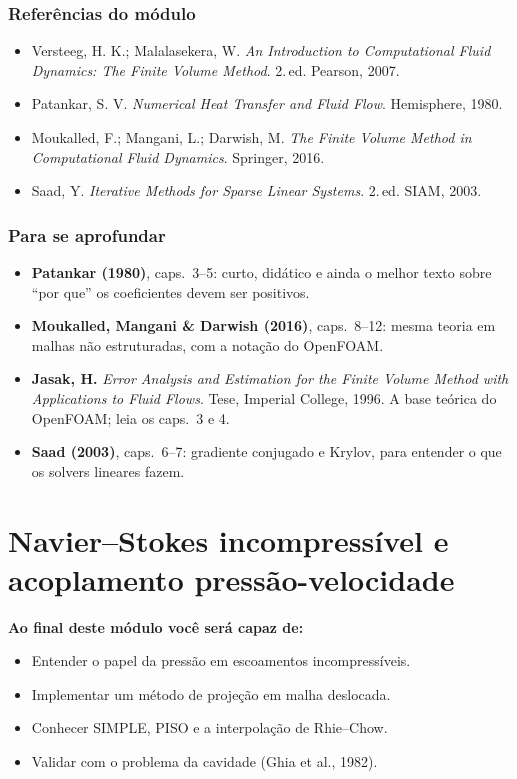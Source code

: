 \documentclass[10pt,a4paper,twocolumn,openany]{report}
\newenvironment{refs}{\subsection*{Referências do módulo}\small}{\par}
\newenvironment{aprofundar}{\subsection*{\textcolor{amarelo}{Para se aprofundar}}\small}{\par}
\newcommand{\objetivos}{\noindent\textbf{Ao final deste módulo você será capaz de:}}
\begin{document}
\begin{refs}
\begin{itemize}
  \item Versteeg, H. K.; Malalasekera, W. \emph{An Introduction to Computational Fluid Dynamics: The Finite Volume Method}. 2.\,ed. Pearson, 2007.
  \item Patankar, S. V. \emph{Numerical Heat Transfer and Fluid Flow}. Hemisphere, 1980.
  \item Moukalled, F.; Mangani, L.; Darwish, M. \emph{The Finite Volume Method in Computational Fluid Dynamics}. Springer, 2016.
  \item Saad, Y. \emph{Iterative Methods for Sparse Linear Systems}. 2.\,ed. SIAM, 2003.
\end{itemize}
\end{refs}

\begin{aprofundar}
\begin{itemize}[leftmargin=*]
  \item \textbf{Patankar (1980)}, caps.\ 3--5: curto, didático e ainda o melhor texto sobre ``por que'' os coeficientes devem ser positivos.
  \item \textbf{Moukalled, Mangani \& Darwish (2016)}, caps.\ 8--12: mesma teoria em malhas não estruturadas, com a notação do OpenFOAM.
  \item \textbf{Jasak, H.} \emph{Error Analysis and Estimation for the Finite Volume Method with Applications to Fluid Flows}. Tese, Imperial College, 1996. A base teórica do OpenFOAM; leia os caps.\ 3 e 4.
  \item \textbf{Saad (2003)}, caps.\ 6--7: gradiente conjugado e Krylov, para entender o que os solvers lineares fazem.
\end{itemize}
\end{aprofundar}

\chapter{Navier--Stokes incompressível e acoplamento pressão-velocidade}

\objetivos
\begin{itemize}
  \item Entender o papel da pressão em escoamentos incompressíveis.
  \item Implementar um método de projeção em malha deslocada.
  \item Conhecer SIMPLE, PISO e a interpolação de Rhie--Chow.
  \item Validar com o problema da cavidade (Ghia et al., 1982).
\end{itemize}
\end{document}
